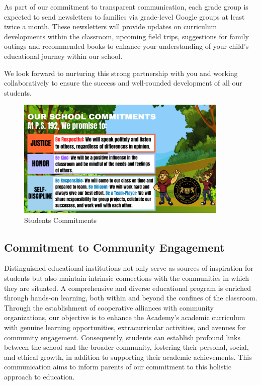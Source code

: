 \documentclass[11pt, letterpaper]{article}
\begin{document}
As part of our commitment to transparent communication, each grade group is expected to send newsletters to families via grade-level Google groups at least twice a month. These newsletters will provide updates on curriculum developments within the classroom, upcoming field trips, suggestions for family outings and recommended books to enhance your understanding of your child's educational journey within our school.

We look forward to nurturing this strong partnership with you and working collaboratively to ensure the success and well-rounded development of all our students.
\begin{figure}[H]
  \centering
  \includegraphics[width=0.9\textwidth]{commitments1}
  \caption{Students Commitments}
  \label{fig:Growth}
\end{figure}
\subsection{Commitment to Community Engagement}
Distinguished educational institutions not only serve as sources of inspiration for students but also maintain intrinsic connections with the communities in which they are situated. A comprehensive and diverse educational program is enriched through hands-on learning, both within and beyond the confines of the classroom. Through the establishment of cooperative alliances with community organizations, our objective is to enhance the Academy's academic curriculum with genuine learning opportunities, extracurricular activities, and avenues for community engagement. Consequently, students can establish profound links between the school and the broader community, fostering their personal, social, and ethical growth, in addition to supporting their academic achievements. This communication aims to inform parents of our commitment to this holistic approach to education.
\end{document}
